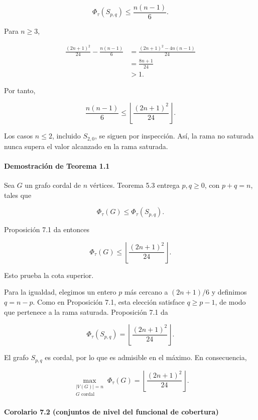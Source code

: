 \documentclass[spanish,11pt,a4paper]{article}
\begin{document}
\[
\Phi_\tau(S_{p,q})
\le
\frac{n(n-1)}6.
\]

Para \(n\ge3\),

\[
\begin{aligned}
\frac{(2n+1)^2}{24}
-
\frac{n(n-1)}6
&=
\frac{(2n+1)^2-4n(n-1)}{24}\\
&=
\frac{8n+1}{24}\\
&>1.
\end{aligned}
\]

Por tanto,

\[
\frac{n(n-1)}6
\le
\left\lfloor\frac{(2n+1)^2}{24}\right\rfloor.
\]

Los casos \(n\le2\), incluido \(S_{2,0}\), se siguen por inspección.
Así, la rama no saturada nunca supera el valor alcanzado en la rama
saturada.

\paragraph{Demostración de Teorema
1.1}\label{demostraciuxf3n-de-teorema-1.1}

Sea \(G\) un grafo cordal de \(n\) vértices. Teorema 5.3 entrega
\(p,q\ge0\), con \(p+q=n\), tales que

\[
\Phi_\tau(G)\le\Phi_\tau(S_{p,q}).
\]

Proposición 7.1 da entonces

\[
\Phi_\tau(G)
\le
\left\lfloor\frac{(2n+1)^2}{24}\right\rfloor.
\]

Esto prueba la cota superior.

Para la igualdad, elegimos un entero \(p\) más cercano a \((2n+1)/6\) y
definimos \(q=n-p\). Como en Proposición 7.1, esta elección satisface
\(q\ge p-1\), de modo que pertenece a la rama saturada. Proposición 7.1
da

\[
\Phi_\tau(S_{p,q})
=
\left\lfloor\frac{(2n+1)^2}{24}\right\rfloor.
\]

El grafo \(S_{p,q}\) es cordal, por lo que es admisible en el máximo. En
consecuencia,

\[
\max_{\substack{|V(G)|=n\\G\text{ cordal}}}
\Phi_\tau(G)
=
\left\lfloor\frac{(2n+1)^2}{24}\right\rfloor.
\]

\paragraph{Corolario 7.2 (conjuntos de nivel del funcional de
cobertura)}\label{corolario-7.2-conjuntos-de-nivel-del-funcional-de-cobertura}
\end{document}
